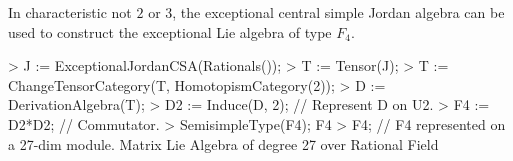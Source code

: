 \begin{example}
In characteristic not $2$ or $3$, the exceptional central 
simple Jordan algebra can be used to construct
the exceptional Lie algebra of type $F_4$.

\begin{code}
> J := ExceptionalJordanCSA(Rationals());
> T := Tensor(J);                                     
> T := ChangeTensorCategory(T, HomotopismCategory(2));
> D := DerivationAlgebra(T);
> D2 := Induce(D, 2);           // Represent D on U2.
> F4 := D2*D2;                  // Commutator.
> SemisimpleType(F4);
F4
> F4;               // F4 represented on a 27-dim module.
Matrix Lie Algebra of degree 27 over Rational Field
\end{code}
\end{example}

